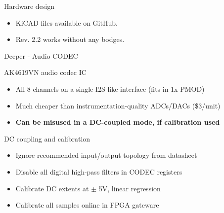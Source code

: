 \documentclass{beamer}
\begin{document}
\begin{frame}{Hardware design}


    \begin{itemize}
        \item KiCAD files available on GitHub.
        \item Rev. 2.2 works without any bodges.
    \end{itemize}

\end{frame}

\begin{frame}{Deeper - Audio CODEC}


    \begin{block}{AK4619VN audio codec IC}
        \begin{itemize}
            \item All 8 channels on a single I2S-like interface (fits in 1x PMOD)
            \item Much cheaper than instrumentation-quality ADCs/DACs (\$3/unit)
            \item \textbf{Can be misused in a DC-coupled mode, if calibration used}
        \end{itemize}
    \end{block}

\end{frame}

\begin{frame}{DC coupling and calibration}


    \begin{itemize}
        \item Ignore recommended input/output topology from datasheet
        \item Disable all digital high-pass filters in CODEC registers
        \item Calibrate DC extents at $\pm$ 5V, linear regression
        \item Calibrate all samples online in FPGA gateware
    \end{itemize}

\end{frame}
\end{document}
